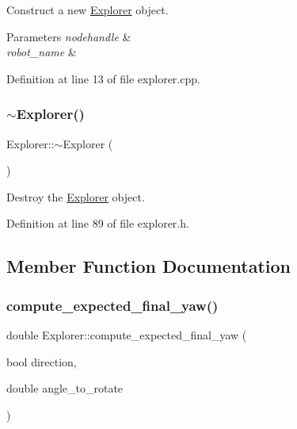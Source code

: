 Construct a new \hyperlink{class_explorer}{Explorer} object. 


\begin{DoxyParams}{Parameters}
{\em nodehandle} & \\
\hline
{\em robot\+\_\+name} & \\
\hline
\end{DoxyParams}


Definition at line 13 of file explorer.\+cpp.

\mbox{\label{class_explorer_aa1b0a71e92e003e9162a5ba99d843392}} 
\subsubsection{\texorpdfstring{$\sim$\+Explorer()}{~Explorer()}}
{\footnotesize\ttfamily Explorer\+::$\sim$\+Explorer (\begin{DoxyParamCaption}{ }\end{DoxyParamCaption})\hspace{0.3cm}{\ttfamily [inline]}}



Destroy the \hyperlink{class_explorer}{Explorer} object. 



Definition at line 89 of file explorer.\+h.



\subsection{Member Function Documentation}
\mbox{\label{class_explorer_a02c37b93448ed474f1bf0d03e2758ca2}} 
\subsubsection{\texorpdfstring{compute\+\_\+expected\+\_\+final\+\_\+yaw()}{compute\_expected\_final\_yaw()}}
{\footnotesize\ttfamily double Explorer\+::compute\+\_\+expected\+\_\+final\+\_\+yaw (\begin{DoxyParamCaption}\item[{bool}]{direction,  }\item[{double}]{angle\+\_\+to\+\_\+rotate }\end{DoxyParamCaption})}



